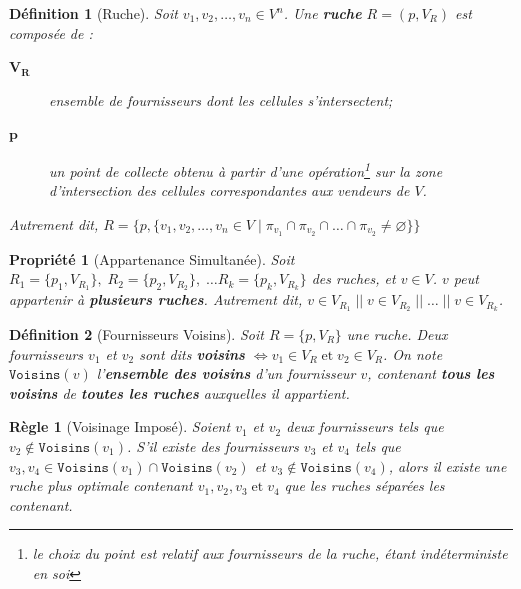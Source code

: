 \documentclass[a4paper,12pt]{report}
\theoremstyle{break}
\theoremstyle{break}
\newtheorem*{definition}{Définition}
\theoremstyle{break}
\newtheorem*{property}{Propriété}
\theoremstyle{break}
\newtheorem*{constraint}{Règle}
\theoremstyle{definition}
\theoremstyle{remark}
\begin{document}
\begin{definition}[Ruche]
Soit $v_1, v_2, \dots, v_n \in V^n$. Une \textbf{ruche} $R = (p, V_R)$ est composée de :
\begin{description}
  \item[$\mathbf{V_R}$]{ensemble de fournisseurs dont les cellules s'intersectent;}
  \item[$\mathbf{p}$]{un point de collecte obtenu à partir d'une opération\footnote{le choix du point est relatif aux fournisseurs de la ruche, étant indéterministe en soi} sur la zone d'intersection des cellules correspondantes aux vendeurs de $V$.}
\end{description}
Autrement dit, $R = \{p, \{v_1, v_2, \dots, v_n \in V\; |\; \pi_{v_1} \cap \pi_{v_2} \cap \dots \cap \pi_{v_2} \neq \varnothing\}\}$
\end{definition}

\begin{property}[Appartenance Simultanée]
Soit $R_1 = \{p_1, V_{R_1}\},\; R_2 = \{p_2, V_{R_2}\},\; \dots R_k = \{p_k, V_{R_k}\}$ des ruches, et $v \in V$. $v$ peut appartenir à \textbf{plusieurs ruches}. Autrement dit, $v \in V_{R_1}\; ||\; v \in V_{R_2}\; ||\; \dots\; ||\; v \in V_{R_k}$.
\end{property}

\begin{definition}[Fournisseurs Voisins]
Soit $R = \{p, V_R\}$ une ruche. Deux fournisseurs $v_1$ et $v_2$ sont dits \textbf{voisins} $\iff v_1 \in V_R\; \text{et}\; v_2 \in V_R$. On note $\texttt{Voisins}(v)$ l'\textbf{ensemble des voisins} d'un fournisseur $v$, contenant \textbf{tous les voisins} de \textbf{toutes les ruches} auxquelles il appartient.
\end{definition}

\begin{constraint}[Voisinage Imposé]
Soient $v_1$ et $v_2$ deux fournisseurs tels que $v_2 \notin \texttt{Voisins}(v_1)$. S'il existe des fournisseurs $v_3$ et $v_4$ tels que $v_3, v_4 \in \texttt{Voisins}(v_1) \cap \texttt{Voisins}(v_2)$ et $v_3 \notin \texttt{Voisins}(v_4)$, alors il existe une ruche plus optimale contenant $v_1, v_2, v_3\; \text{et}\; v_4$ que les ruches séparées les contenant.
\end{constraint}
\end{document}
